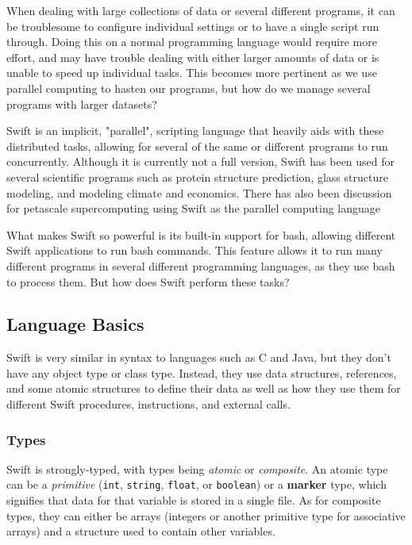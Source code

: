 \swiftColor

When dealing with large collections of data or several different programs, it can be troublesome to configure individual settings or to have a single script run through. Doing this on a normal programming language would require more effort, and may have trouble dealing with either larger amounts of data or is unable to speed up individual tasks. This becomes more pertinent as we use parallel computing to hasten our programs, but how do we manage several programs with larger datasets?

Swift is an implicit, "parallel", scripting language that heavily aids with these distributed tasks, allowing for several of the same or different programs to run concurrently. Although it is currently not a full version, Swift has been used for several scientific programs such as protein structure prediction, glass structure modeling, and modeling climate and economics. There has also been discussion for petascale supercomputing using Swift as the parallel computing language \cite{wilde2009parallel}

What makes Swift so powerful is its built-in support for bash, allowing different Swift applications to run bash commands. This feature allows it to run many different programs in several different programming languages, as they use bash to process them. But how does Swift perform these tasks?

\subsection{Language Basics}
    Swift is very similar in syntax to languages such as C and Java, but they don't have any object type or class type. Instead, they use data structures, references, and some atomic structures to define their data as well as how they use them for different Swift procedures, instructions, and external calls. \cite{website:swift-lang-documentation}

    \subsubsection{Types}
        Swift is strongly-typed, with types being \textit{atomic} or \textit{composite}. An atomic type can be a \textit{primitive} (\texttt{int}, \texttt{string}, \texttt{float}, or \texttt{boolean}) or a \textbf{marker} type, which signifies that data for that variable is stored in a single file. As for composite types, they can either be arrays (integers or another primitive type for associative arrays) and a structure used to contain other variables.

